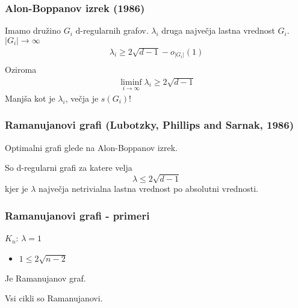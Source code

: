 \documentclass{beamer}
\begin{document}
\begin{frame}
    \frametitle{Alon-Boppanov izrek (1986)}
    Imamo družino \(G_i\) d-regularnih grafov. \(\lambda_i\) druga največja lastna vrednost \(G_i\). \(|G_i| \to \infty\)
    \begin{align*}
        \lambda_i \geq 2\sqrt{d-1} -o_{|G_i|}(1) \\
    \end{align*}
    Oziroma
    \begin{align*}
        \liminf_{i\to\infty} \lambda_i \geq 2\sqrt{d-1}
    \end{align*}
    Manjša kot je \(\lambda_i\), večja je \(s(G_i)\)!
\end{frame}
\begin{frame}
    \frametitle{Ramanujanovi grafi (Lubotzky, Phillips and Sarnak, 1986)}
    Optimalni grafi glede na Alon-Boppanov izrek. \pause

    So d-regularni grafi za katere velja
    \[
        \lambda \leq 2\sqrt{d-1}
    \]
    kjer je \(\lambda\) največja netrivialna lastna vrednost po absolutni vrednosti.
\end{frame}
\begin{frame}
    \frametitle{Ramanujanovi grafi - primeri}
    \(K_n\): \(\lambda = 1\)
    \begin{itemize}
        \item \(1 \leq 2 \sqrt{n-2}\)
    \end{itemize}
    Je Ramanujanov graf.

    Vsi cikli so Ramanujanovi.
\end{frame}
\end{document}

